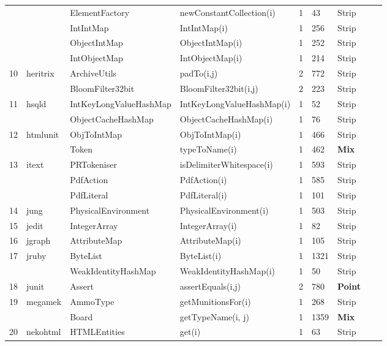 \begin{table}[h]
{\begin{tabular}{|l|l|l|l|l|l|l|l|l|}
	&				& ElementFactory			& newConstantCollection(i)& 1			& 43	& Strip  										 \\ 
	&				& IntIntMap				& IntIntMap(i)			& 1			& 256	& Strip										\\ 
	&				& ObjectIntMap			& ObjectIntMap(i)			& 1			& 252	& Strip 										\\ 
	&				& IntObjectMap			& IntObjectMap(i)			& 1			& 214	& Strip 										\\ 
10	&	heritrix		& ArchiveUtils			& padTo(i,j)				& 2			& 772	& Strip  										\\ 
	&				& BloomFilter32bit 		& BloomFilter32bit(i,j)		& 2	 		& 223	& Strip  										\\ 
11	&	hsqld		& IntKeyLongValueHashMap& IntKeyLongValueHashMap(i)& 1		& 52	& Strip 										\\ 
	&				& ObjectCacheHashMap	& ObjectCacheHashMap(i)	& 1			& 76	& Strip   										\\ 
12	&	htmlunit		& ObjToIntMap			& ObjToIntMap(i)			& 1			& 466	& Strip  										\\ 
	&				& Token					& typeToName(i)			& 1			& 462	& {\bf Mix} 										\\ 
13	&	itext		& PRTokeniser			& isDelimiterWhitespace(i)	& 1			& 593	& Strip  										\\ 
	&				& PdfAction				& PdfAction(i)			& 1			& 585	& Strip  										\\ 
	&				& PdfLiteral				& PdfLiteral(i)			& 1			& 101	& Strip 										\\ 
14	&	jung		& PhysicalEnvironment	& PhysicalEnvironment(i)	& 1			& 503	& Strip 										\\ 
15	&	jedit		& IntegerArray			& IntegerArray(i)			& 1			& 82	& Strip  										\\ 
16	&	jgraph		& AttributeMap			& AttributeMap(i)			& 1			& 105	& Strip										\\ 
17	&	jruby		& ByteList				& ByteList(i)				& 1			& 1321	& Strip 										\\ 
	&				& WeakIdentityHashMap	& WeakIdentityHashMap(i)	& 1			& 50	& Strip 										\\ 
18	&	junit		& Assert					& assertEquals(i,j)		& 2			& 780	& {\bf Point} 										\\ 
19	&	megamek	& AmmoType			& getMunitionsFor(i)		& 1			& 268	& Strip	  									\\ 			
	&				& Board					& getTypeName(i, j)		& 1			& 1359	& {\bf Mix} 										\\ 
20	&	nekohtml	& HTMLEntities			& get(i)					& 1			& 63	& Strip  										\\ 

\end{tabular}}
\end{table}

